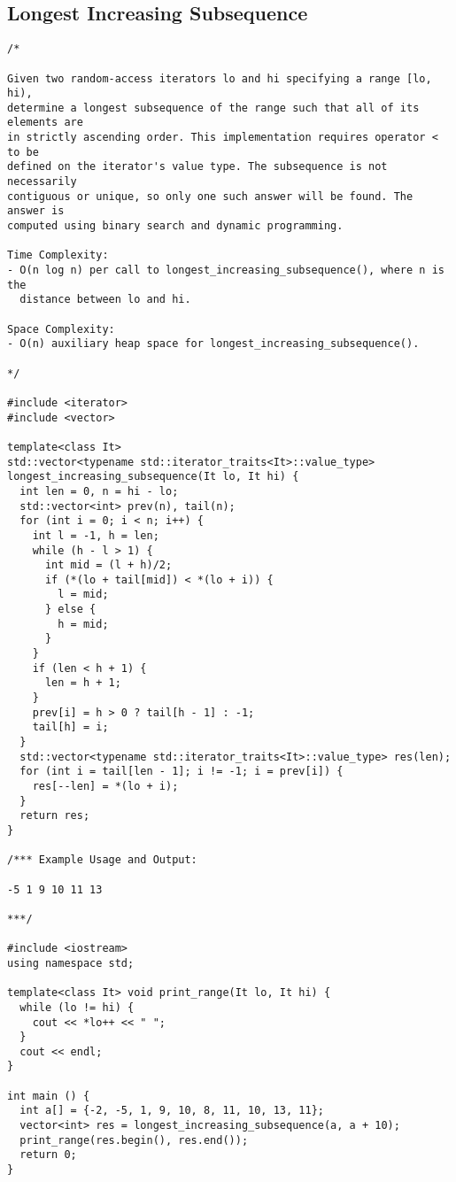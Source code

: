 \subsection{Longest Increasing Subsequence}
\begin{lstlisting}
/*

Given two random-access iterators lo and hi specifying a range [lo, hi),
determine a longest subsequence of the range such that all of its elements are
in strictly ascending order. This implementation requires operator < to be
defined on the iterator's value type. The subsequence is not necessarily
contiguous or unique, so only one such answer will be found. The answer is
computed using binary search and dynamic programming.

Time Complexity:
- O(n log n) per call to longest_increasing_subsequence(), where n is the
  distance between lo and hi.

Space Complexity:
- O(n) auxiliary heap space for longest_increasing_subsequence().

*/

#include <iterator>
#include <vector>

template<class It>
std::vector<typename std::iterator_traits<It>::value_type>
longest_increasing_subsequence(It lo, It hi) {
  int len = 0, n = hi - lo;
  std::vector<int> prev(n), tail(n);
  for (int i = 0; i < n; i++) {
    int l = -1, h = len;
    while (h - l > 1) {
      int mid = (l + h)/2;
      if (*(lo + tail[mid]) < *(lo + i)) {
        l = mid;
      } else {
        h = mid;
      }
    }
    if (len < h + 1) {
      len = h + 1;
    }
    prev[i] = h > 0 ? tail[h - 1] : -1;
    tail[h] = i;
  }
  std::vector<typename std::iterator_traits<It>::value_type> res(len);
  for (int i = tail[len - 1]; i != -1; i = prev[i]) {
    res[--len] = *(lo + i);
  }
  return res;
}

/*** Example Usage and Output:

-5 1 9 10 11 13

***/

#include <iostream>
using namespace std;

template<class It> void print_range(It lo, It hi) {
  while (lo != hi) {
    cout << *lo++ << " ";
  }
  cout << endl;
}

int main () {
  int a[] = {-2, -5, 1, 9, 10, 8, 11, 10, 13, 11};
  vector<int> res = longest_increasing_subsequence(a, a + 10);
  print_range(res.begin(), res.end());
  return 0;
}
\end{lstlisting}
